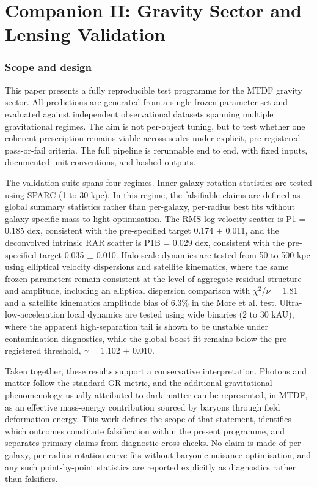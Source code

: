 \documentclass[11pt,a4paper]{article}
\begin{document}
\part{Companion II: Gravity Sector and Lensing Validation}

\section{Scope and design}
\label{sec:scope}
This paper presents a fully reproducible test programme for the MTDF gravity sector. All predictions are generated from a single frozen parameter set and evaluated against independent observational datasets spanning multiple gravitational regimes. The aim is not per-object tuning, but to test whether one coherent prescription remains viable across scales under explicit, pre-registered pass-or-fail criteria. The full pipeline is rerunnable end to end, with fixed inputs, documented unit conventions, and hashed outputs.

The validation suite spans four regimes. Inner-galaxy rotation statistics are tested using SPARC (1 to 30 kpc). In this regime, the falsifiable claims are defined as global summary statistics rather than per-galaxy, per-radius best fits without galaxy-specific mass-to-light optimisation. The RMS log velocity scatter is P1 = 0.185 dex, consistent with the pre-specified target 0.174 $\pm$ 0.011, and the deconvolved intrinsic RAR scatter is P1B = 0.029 dex, consistent with the pre-specified target 0.035 $\pm$ 0.010. Halo-scale dynamics are tested from 50 to 500 kpc using elliptical velocity dispersions and satellite kinematics, where the same frozen parameters remain consistent at the level of aggregate residual structure and amplitude, including an elliptical dispersion comparison with $\chi$$^{2}$/$\nu$ = 1.81 and a satellite kinematics amplitude bias of 6.3\% in the More et al. test. Ultra-low-acceleration local dynamics are tested using wide binaries (2 to 30 kAU), where the apparent high-separation tail is shown to be unstable under contamination diagnostics, while the global boost fit remains below the pre-registered threshold, $\gamma$ = 1.102 $\pm$ 0.010.

Taken together, these results support a conservative interpretation. Photons and matter follow the standard GR metric, and the additional gravitational phenomenology usually attributed to dark matter can be represented, in MTDF, as an effective mass-energy contribution sourced by baryons through field deformation energy. This work defines the scope of that statement, identifies which outcomes constitute falsification within the present programme, and separates primary claims from diagnostic cross-checks. No claim is made of per-galaxy, per-radius rotation curve fits without baryonic nuisance optimisation, and any such point-by-point statistics are reported explicitly as diagnostics rather than falsifiers.
\end{document}
